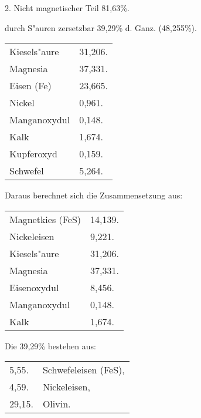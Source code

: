 \documentclass[a4paper, 11pt, oneside]{article}
\begin{document}
\begin{center}
2. Nicht magnetischer Teil 81,63\%.
\end{center}

\begin{center}
durch S"auren zersetzbar 39,29\% d. Ganz. (48,255\%).
\end{center}

\begin{table}[H]
    \centering\swabfamily\Large
    \begin{tabular}{l l}
        \hline
        Kiesels"aure & 31,206. \\
        Magnesia & 37,331. \\
        Eisen (Fe) & 23,665. \\
        Nickel & 0,961. \\
        Manganoxydul & 0,148. \\
        Kalk & 1,674. \\
        Kupferoxyd & 0,159. \\
        Schwefel & 5,264. \\
    \end{tabular}
\end{table}

\begin{center}
Daraus berechnet sich die Zusammensetzung aus:
\end{center}

\begin{table}[H]
    \centering\swabfamily\Large
    \begin{tabular}{l l}
        Magnetkies (FeS) & 14,139. \\
        Nickeleisen & 9,221. \\
        Kiesels"aure & 31,206. \\
        Magnesia & 37,331. \\
        Eisenoxydul & 8,456. \\
        Manganoxydul & 0,148. \\
        Kalk & 1,674. \\
    \end{tabular}
\end{table}

\begin{center}
Die 39,29\% bestehen aus:
\end{center}

\begin{table}[H]
    \centering\swabfamily\Large
    \begin{tabular}{l l}
        5,55. & Schwefeleisen (FeS), \\
        4,59. & Nickeleisen, \\
        29,15. & Olivin. \\
    \end{tabular}
\end{table}
\end{document}
